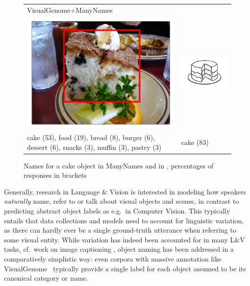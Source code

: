 \begin{figure}[tbp]
\scriptsize
\begin{tabular}{p{4.5cm}p{2cm}}
VisualGenome+ManyNames & \cite{snodgrass}\\
\includegraphics[scale=0.15]{figures/2390077_1254219_supercat_unique.png} &
\includegraphics[scale=0.4]{figures/snodgrass_vanderwart_cake_042.png}\\
 cake (53),  food (19), bread (8), burger (6), dessert (6), snacks (3), muffin (3),  pastry (3) & \hspace{0.5cm} cake (83)
\end{tabular}
\caption{Names for a cake object in ManyNames and in \cite{snodgrass}, percentages of responses in brackets}
\label{fig:cake}
\vspace{-0.5cm}
\end{figure}

Generally, research in Language \& Vision is interested in modeling how speakers \textit{naturally} name, refer to or talk about visual objects and scenes, in contrast to predicting abstract object labels as e.g.\ in Computer Vision.
This typically entails that data collections and models need to account for linguistic variation, as there can hardly ever be a single ground-truth utterance when referring to some visual entity. 
While variation has indeed been accounted for in many L\&V tasks, cf.\ work on image captioning \cite{Bernardietal:automatic}, object naming has been addressed in a comparatively simplistic way: 
even corpora with massive annotation like VisualGenome~\cite{krishna2016visualgenome} typically provide a single label for each object assumed to be its canonical category or name.

